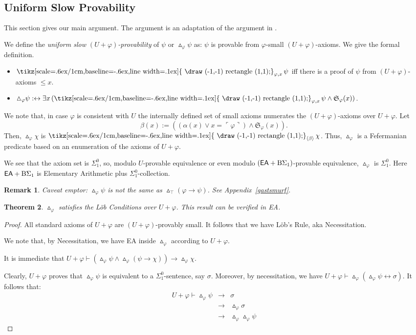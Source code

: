 \documentclass{amsart}
\newcommand{\qee} {\hspace*{2mm}\hfill \ding{109}}
\renewcommand{\iff}{\leftrightarrow}
\renewcommand{\leq}{\leqslant}
\renewcommand{\phi}{\varphi}
\newtheorem{theorem}{Theorem}[section]
\newtheorem{rem}[theorem]{Remark}
\newenvironment{remark}{\begin{rem} \rm}{\qee\end{rem}}
\DeclareMathOperator{\necessary}{\text{\tikz[scale=.6ex/1cm,baseline=-.6ex,line width=.1ex]{
                            \draw (-1,-1) rectangle (1,1);}}}
\newcommand{\gnum}[1]{{\ulcorner #1 \urcorner}}
\newcommand{\mf}[1]{{\mathfrak {#1}}}
\newcommand{\tupel}[1]{{\langle #1 \rangle}}
\newcommand{\apr}{{\vartriangle}}
\newcommand{\opr}{\necessary}
\newcommand{\qedright}{\belowdisplayskip=-12pt}
\begin{document}
\subsection{Uniform Slow Provability}
This section gives our main argument. The argument is an adaptation of the argument in
\cite{viss:abso21}.

We define the \emph{uniform slow $(U+\phi)$-provability} of $\psi$ or $\apr_\phi \psi$ as: $\psi$ is provable from $\phi$-small $(U+\phi)$-axioms. 
We give the formal definition.
\begin{itemize}
\item
$\opr_{\phi,x}\psi$ iff there is a proof of $\psi$ from $(U+\phi)$-axioms $\leq x$.
\item
$ \apr_\phi \psi :\iff \exists x\, (\opr_{\phi,x}\psi \wedge {\mf S}_\phi(x))$.
\end{itemize}

We note that, in case $\phi$ is consistent with $U$ the internally defined set of small axioms numerates the $(U+\phi)$-axioms over $U+\phi$.
Let \[\beta(x) := ((\alpha(x)\vee x=\gnum\phi) \wedge \mf S_\phi(x)).\] Then, $\apr_\phi \chi$ is $\opr_{\tupel\beta}\chi$. 
Thus, $\apr_\phi$ is a Fefermanian predicate based on an enumeration of the axioms of
$U+\phi$. 

We see that the  axiom set is $\Sigma^0_1$, so, modulo $U$-provable equivalence or even modulo $({\sf EA}+\mathrm B\Sigma_1)$-provable equivalence, 
$\apr_\phi$ is $\Sigma_1^0$. 
Here   ${\sf EA}+\mathrm B\Sigma_1$ is Elementary Arithmetic plus $\Sigma^0_1$-collection.

\begin{remark}
\emph{Caveat emptor:}
 $\apr_\phi\psi$ is \emph{not} the same as $\apr_\top(\phi \to \psi)$.
 See Appendix~\ref{gastsmurf}.
 \end{remark}

\begin{theorem}\label{loebsmurf}
$\apr_\phi$ satisfies the L\"ob Conditions over $U+\phi$.
This result can be verified in {\sf EA}.
\end{theorem}

\begin{proof}
All standard axioms of $U+\phi$ are $(U+\phi)$-provably small.
It follows that we have L\"ob's Rule, aka Necessitation.

We note that, by Necessitation, we have {\sf EA} inside $\apr_\phi$ according to 
$U+\phi$.

It is immediate that $U+\phi \vdash (\apr_\phi\psi \wedge \apr_\phi (\psi\to\chi)) \to \apr_\phi\chi$.

Clearly, $U+\phi$ proves that $\apr_\phi\psi$ is equivalent to a $\Sigma^0_1$-sentence, say $\sigma$.
Moreover, by necessitation, we have $U+\phi \vdash \apr_\phi(\apr_\phi\psi \iff \sigma)$. 
It follows that:\qedright
\begin{eqnarray*}
U+ \phi \vdash \apr_\phi\psi & \to & \sigma\\
& \to & \apr_\phi \sigma \\
& \to & \apr_\phi \apr_\phi \psi
\end{eqnarray*}
 \end{proof}
 
\end{document}
